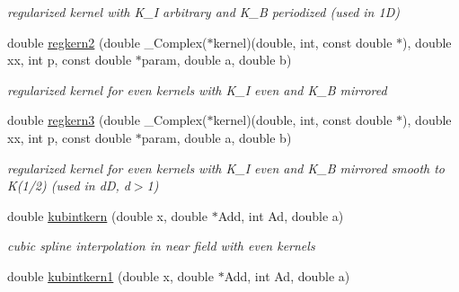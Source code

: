 \begin{CompactItemize}
\begin{CompactList}\small\item\em regularized kernel with K\_\-I arbitrary and K\_\-B periodized (used in 1D) \item\end{CompactList}\item 
\hypertarget{group__applications__fastsum_g90524637b6a6b87c1b91688138792da7}{
double \hyperlink{group__applications__fastsum_g90524637b6a6b87c1b91688138792da7}{regkern2} (double \_\-Complex($\ast$kernel)(double, int, const double $\ast$), double xx, int p, const double $\ast$param, double a, double b)}
\label{group__applications__fastsum_g90524637b6a6b87c1b91688138792da7}

\begin{CompactList}\small\item\em regularized kernel for even kernels with K\_\-I even and K\_\-B mirrored \item\end{CompactList}\item 
\hypertarget{group__applications__fastsum_g882707fc3173608ec8822867f9972a0d}{
double \hyperlink{group__applications__fastsum_g882707fc3173608ec8822867f9972a0d}{regkern3} (double \_\-Complex($\ast$kernel)(double, int, const double $\ast$), double xx, int p, const double $\ast$param, double a, double b)}
\label{group__applications__fastsum_g882707fc3173608ec8822867f9972a0d}

\begin{CompactList}\small\item\em regularized kernel for even kernels with K\_\-I even and K\_\-B mirrored smooth to K(1/2) (used in dD, d$>$1) \item\end{CompactList}\item 
\hypertarget{group__applications__fastsum_gb7c93097f39ef84cbe6f7f7f715590aa}{
double \hyperlink{group__applications__fastsum_gb7c93097f39ef84cbe6f7f7f715590aa}{kubintkern} (double x, double $\ast$Add, int Ad, double a)}
\label{group__applications__fastsum_gb7c93097f39ef84cbe6f7f7f715590aa}

\begin{CompactList}\small\item\em cubic spline interpolation in near field with even kernels \item\end{CompactList}\item 
\hypertarget{group__applications__fastsum_g0b76080e32db9fac633c35f105d03f62}{
double \hyperlink{group__applications__fastsum_g0b76080e32db9fac633c35f105d03f62}{kubintkern1} (double x, double $\ast$Add, int Ad, double a)}
\label{group__applications__fastsum_g0b76080e32db9fac633c35f105d03f62}


\end{CompactItemize}
